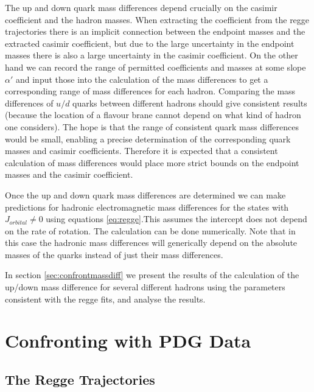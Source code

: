 \documentclass[11pt,a4paper]{article}
\begin{document}
The up and down quark mass differences depend crucially on the casimir coefficient and the hadron masses. When extracting the coefficient from the regge trajectories there is an implicit connection between the endpoint masses and the extracted casimir coefficient, but due to the large uncertainty in the endpoint masses there is also a large uncertainty in the casimir coefficient. On the other hand we can record the range of permitted coefficients and masses at some slope $\alpha'$ and input those into the calculation of the mass differences to get a corresponding range of mass differences for each hadron. Comparing the mass differences of $u/d$ quarks between different hadrons should give consistent results (because the location of a flavour brane cannot depend on what kind of hadron one considers). The hope is that the range of consistent quark mass differences would be small, enabling a precise determination of the corresponding quark masses and casimir coefficients. Therefore it is expected that a consistent calculation of mass differences would place more strict bounds on the endpoint masses and the casimir coefficient.

Once the up and down quark mass differences are determined we can make predictions for hadronic electromagnetic mass differences for the states with $J_{orbital}\neq 0$ using equations \ref{eq:regge}.This assumes the intercept does not depend on the rate of rotation. The calculation can be done numerically. Note that in this case the hadronic mass differences will generically depend on the absolute masses of the quarks instead of just their mass differences.

In section \ref{sec:confrontmassdiff} we present the results of the calculation of the up/down mass difference for several different hadrons using the parameters consistent with the regge fits, and analyse the results.

\FloatBarrier
\section{Confronting with PDG Data}

\subsection{The Regge Trajectories}
\label{sec:reggefit}
\end{document}
